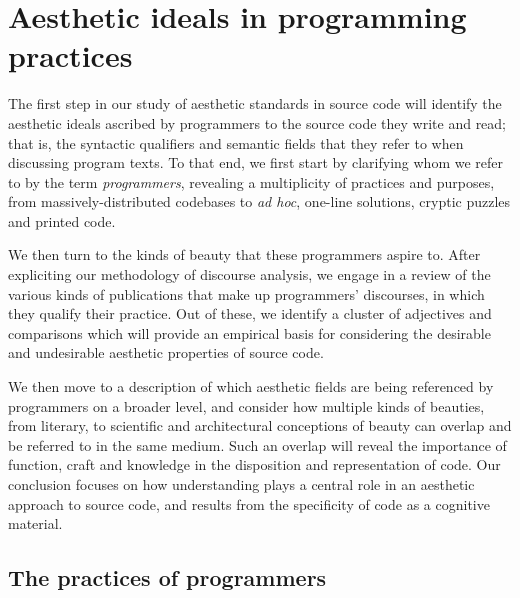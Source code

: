 \chapter{Aesthetic ideals in programming practices}
\label{chap:ideals}

The first step in our study of aesthetic standards in source code will identify the aesthetic ideals ascribed by programmers to the source code they write and read; that is, the syntactic qualifiers and semantic fields that they refer to when discussing program texts. To that end, we first start by clarifying whom we refer to by the term \emph{programmers}, revealing a multiplicity of practices and purposes, from massively-distributed codebases to \emph{ad hoc}, one-line solutions, cryptic puzzles and printed code.

We then turn to the kinds of beauty that these programmers aspire to. After expliciting our methodology of discourse analysis, we engage in a review of the various kinds of publications that make up programmers' discourses, in which they qualify their practice. Out of these, we identify a cluster of adjectives and comparisons which will provide an empirical basis for considering the desirable and undesirable aesthetic properties of source code.

We then move to a description of which aesthetic fields are being referenced by programmers on a broader level, and consider how multiple kinds of beauties, from literary, to scientific and architectural conceptions of beauty can overlap and be referred to in the same medium. Such an overlap will reveal the importance of function, craft and knowledge in the disposition and representation of code. Our conclusion focuses on how understanding plays a central role in an aesthetic approach to source code, and results from the specificity of code as a cognitive material.

\section{The practices of programmers}
\label{sec:practice-programmers}

